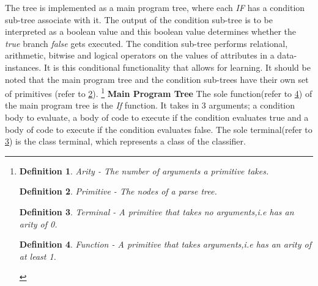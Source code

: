 \documentclass[a4paper,12pt]{article}
\newtheorem{definition}{Definition}[section]
\begin{document}
{                The tree is implemented as a main program tree, where each \textit{IF} has a condition sub-tree associate with it. The output of the condition sub-tree 
                is to be interpreted as a boolean value and this boolean value determines whether the \textit{true} branch \textit{false} gets executed. The condition sub-tree 
                performs relational, arithmetic, bitwise and logical operators on the values of attributes in a data-instances. It is this conditional functionality that allows for learning.\newline 
                \newline 
                It should be noted that the main program tree and the condition sub-trees have their own set of primitives (refer to \ref{def:primitive}).\newline 
                \footnote{
                    \tiny 
                    \begin{definition}\label{def:arity}
                        Arity - The number of arguments a primitive takes.
                    \end{definition} 
                    \begin{definition} \label{def:primitive}
                        Primitive - The nodes of a parse tree.
                    \end{definition} 
                    \begin{definition}\label{def:terminal}
                        Terminal - A primitive that takes no arguments,i.e has an arity of 0.
                    \end{definition} 
                    \begin{definition} \label{def:function}
                        Function - A primitive that takes arguments,i.e has an arity of at least 1.
                    \end{definition} 
                }
                \newpage
                \noindent \textbf{Main Program Tree} \newline 
                The sole function(refer to \ref{def:function}) of the main program tree is the \textit{If} function. It takes in 3 arguments; a condition body to evaluate, a body of code 
                to execute if the condition evaluates true and a body of code to execute if the condition evaluates false. The sole terminal(refer to \ref{def:terminal}) is the class terminal, which represents
                a class of the classifier. \newline 
                \newline 
}
\end{document}
